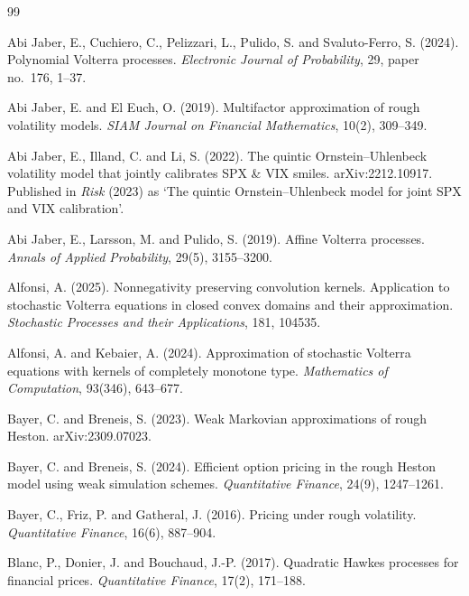 \documentclass[11pt,a4paper]{article}
\theoremstyle{definition}
\begin{document}
\begin{thebibliography}{99}

Abi Jaber, E., Cuchiero, C., Pelizzari, L., Pulido, S. and Svaluto-Ferro, S. (2024). Polynomial Volterra processes. \emph{Electronic Journal of Probability}, 29, paper no.~176, 1--37.

Abi Jaber, E. and El Euch, O. (2019). Multifactor approximation of rough volatility models. \emph{SIAM Journal on Financial Mathematics}, 10(2), 309--349.

Abi Jaber, E., Illand, C. and Li, S. (2022). The quintic Ornstein--Uhlenbeck volatility model that jointly calibrates SPX \& VIX smiles. arXiv:2212.10917. Published in \emph{Risk} (2023) as `The quintic Ornstein--Uhlenbeck model for joint SPX and VIX calibration'.

Abi Jaber, E., Larsson, M. and Pulido, S. (2019). Affine Volterra processes. \emph{Annals of Applied Probability}, 29(5), 3155--3200.

Alfonsi, A. (2025). Nonnegativity preserving convolution kernels. Application to stochastic Volterra equations in closed convex domains and their approximation. \emph{Stochastic Processes and their Applications}, 181, 104535.

Alfonsi, A. and Kebaier, A. (2024). Approximation of stochastic Volterra equations with kernels of completely monotone type. \emph{Mathematics of Computation}, 93(346), 643--677.

Bayer, C. and Breneis, S. (2023). Weak Markovian approximations of rough Heston. arXiv:2309.07023.

Bayer, C. and Breneis, S. (2024). Efficient option pricing in the rough Heston model using weak simulation schemes. \emph{Quantitative Finance}, 24(9), 1247--1261.

Bayer, C., Friz, P. and Gatheral, J. (2016). Pricing under rough volatility. \emph{Quantitative Finance}, 16(6), 887--904.

Blanc, P., Donier, J. and Bouchaud, J.-P. (2017). Quadratic Hawkes processes for financial prices. \emph{Quantitative Finance}, 17(2), 171--188.


\end{thebibliography}
\end{document}
